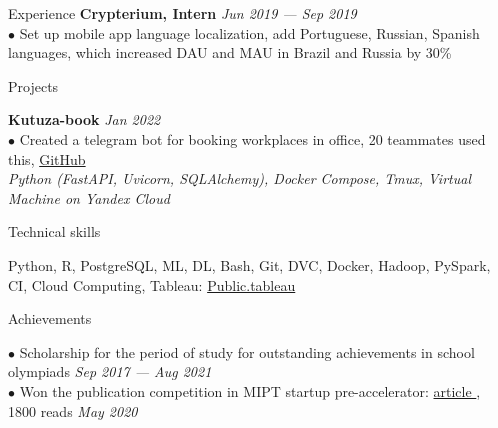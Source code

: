 \documentclass{resume} %
\begin{document}
\begin{rSection}{ Experience }
    { \bf Crypterium, Intern} \hfill {\em Jun 2019 — Sep 2019}\\
    { $\bullet$ Set up mobile app language localization, add Portuguese, Russian, Spanish languages, which increased DAU and MAU in Brazil and Russia by 30\%}\\

\end{rSection}

\begin{rSection}{ Projects }

    { \bf Kutuza-book} \hfill {\em Jan 2022}\\
    { $\bullet$ Created a telegram bot for booking workplaces in office, 20 teammates used this, \href{https://github.com/YHx07/Kutuza-book}{GitHub}}\\
    { \it Python (FastAPI, Uvicorn, SQLAlchemy), Docker Compose, Tmux, Virtual Machine on Yandex Cloud }
    
\end{rSection}
    
\begin{rSection}{ Technical skills }
    
    Python, R, PostgreSQL, ML, DL, Bash, Git, DVC, Docker, Hadoop, PySpark, CI, Cloud Computing, Tableau: \href{https://public.tableau.com/profile/dmitriy5983#!/}{Public.tableau}

\end{rSection}

\begin{rSection}{ Achievements }

    { $\bullet$ Scholarship for the period of study for outstanding achievements in school olympiads } \hfill {\em Sep 2017 — Aug 2021}\\
    { $\bullet$ Won the publication competition in MIPT startup pre-accelerator: \href{https://vc.ru/tribuna/125433-kak-my-hoteli-pomoch-taksistam-no-pandemiya-vse-isportila}{ article }, 1800 reads }\hfill {\em May 2020}

\end{rSection}
\end{document}
